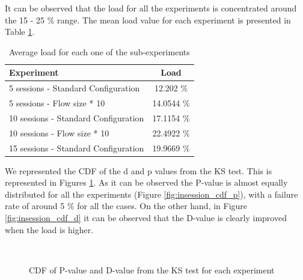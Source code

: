 It can be observed that the load for all the experiments is concentrated around the 15 - 25 \% range. The mean load value for each experiment is presented in Table \ref{table:insession_mean_load}.

\begin{table}[h]
	\begin{center}
		\begin{tabular}{ l | c }
			Experiment & Load \\ \hline
			5 sessions - Standard Configuration & 12.202 \% \\
			5 sessions - Flow size * 10 & 14.0544 \% \\
			10 sessions - Standard Configuration & 17.1154 \% \\
			10 sessions - Flow size * 10 & 22.4922 \% \\
			15 sessions - Standard Configuration & 19.9669 \% \\
		\end{tabular}
		\caption{Average load for each one of the sub-experiments}
		\label{table:insession_mean_load}
	\end{center}
\end{table}

We represented the CDF of the d and p values from the KS test. This is represented in Figures \ref{fig:cdf_p_d}. As it can be observed the P-value is almost equally distributed for all the experiments (Figure \ref{fig:insession_cdf_p}), with a failure rate of around 5 \% for all the cases. On the other hand, in Figure \ref{fig:insession_cdf_d} it can be observed that the D-value is clearly improved when the load is higher.

\begin{figure}[h!]
	\centering
	\\
	\caption{CDF of P-value and D-value from the KS test for each experiment}
	\label{fig:cdf_p_d}
\end{figure}

